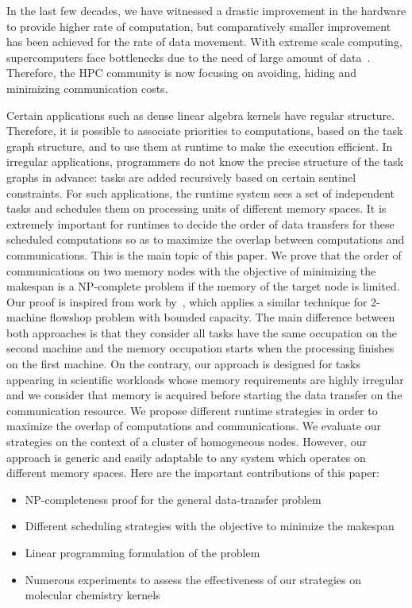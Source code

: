 \documentclass[sigconf]{acmart}
\begin{document}
	
	In the last few decades, we have witnessed a drastic improvement in the hardware to provide higher rate of computation, but comparatively smaller improvement has been achieved for the rate of data movement. With extreme scale computing, supercomputers face bottlenecks due to the need of large amount of data~\cite{ascaccommitteereport2014,yelick2016}. Therefore, the HPC community is now focusing on avoiding, hiding and minimizing communication costs.
	
	
	Certain applications such as dense linear algebra kernels have regular structure. Therefore, it is possible to associate priorities to computations, based on the task graph structure, and to use them at runtime to make the execution efficient. In irregular applications, programmers do not know the precise structure of the task graphs in advance: tasks are added recursively based on certain sentinel constraints. For such applications, the runtime system sees a set of independent tasks and schedules them on processing units of different memory spaces. It is extremely important for runtimes to decide the order of data transfers for these scheduled computations so as to maximize the overlap between computations and communications. This is the main topic of this paper. We prove that the order of communications on two memory nodes with the objective of minimizing the makespan is a NP-complete problem if the memory of the target node is limited. Our proof is inspired from work by~\cite{Papadimitriou:1980:FSL:322203.322213}, which applies a similar technique for 2-machine flowshop problem with bounded capacity. The main difference between both approaches is that they consider all tasks have the same occupation on the second machine and the memory occupation starts when the processing finishes on the first machine. On the contrary, our approach is designed for tasks appearing in scientific workloads whose memory requirements are highly irregular and we consider that memory is acquired before starting the data transfer on the communication resource. We propose different runtime strategies in order to maximize the overlap of computations and communications. We evaluate our strategies on the context of a cluster of homogeneous nodes. However, our approach is generic and easily adaptable to any system which operates on different memory spaces. Here are the important contributions of this paper:
	
	
	\renewcommand{\labelitemi}{$\bullet$}
	\begin{itemize}
		\item NP-completeness proof for the general data-transfer problem 
		\item Different scheduling strategies with the objective to minimize the makespan
		\item Linear programming formulation of the problem
		\item Numerous experiments to assess the effectiveness of our strategies on molecular chemistry kernels 
	\end{itemize}
	
\end{document}
